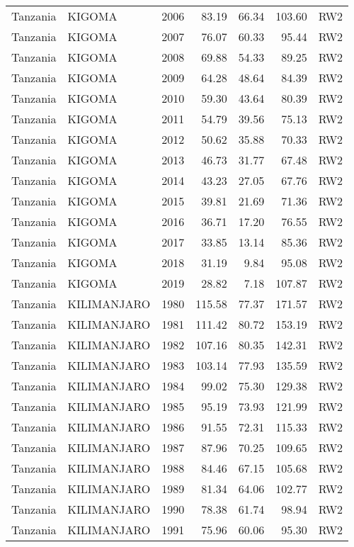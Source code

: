 \begin{longtable}{lllrrrl}
  Tanzania & KIGOMA & 2006 & 83.19 & 66.34 & 103.60 & RW2 \\ 
  Tanzania & KIGOMA & 2007 & 76.07 & 60.33 & 95.44 & RW2 \\ 
  Tanzania & KIGOMA & 2008 & 69.88 & 54.33 & 89.25 & RW2 \\ 
  Tanzania & KIGOMA & 2009 & 64.28 & 48.64 & 84.39 & RW2 \\ 
  Tanzania & KIGOMA & 2010 & 59.30 & 43.64 & 80.39 & RW2 \\ 
  Tanzania & KIGOMA & 2011 & 54.79 & 39.56 & 75.13 & RW2 \\ 
  Tanzania & KIGOMA & 2012 & 50.62 & 35.88 & 70.33 & RW2 \\ 
  Tanzania & KIGOMA & 2013 & 46.73 & 31.77 & 67.48 & RW2 \\ 
  Tanzania & KIGOMA & 2014 & 43.23 & 27.05 & 67.76 & RW2 \\ 
  Tanzania & KIGOMA & 2015 & 39.81 & 21.69 & 71.36 & RW2 \\ 
  Tanzania & KIGOMA & 2016 & 36.71 & 17.20 & 76.55 & RW2 \\ 
  Tanzania & KIGOMA & 2017 & 33.85 & 13.14 & 85.36 & RW2 \\ 
  Tanzania & KIGOMA & 2018 & 31.19 & 9.84 & 95.08 & RW2 \\ 
  Tanzania & KIGOMA & 2019 & 28.82 & 7.18 & 107.87 & RW2 \\ 
  Tanzania & KILIMANJARO & 1980 & 115.58 & 77.37 & 171.57 & RW2 \\ 
  Tanzania & KILIMANJARO & 1981 & 111.42 & 80.72 & 153.19 & RW2 \\ 
  Tanzania & KILIMANJARO & 1982 & 107.16 & 80.35 & 142.31 & RW2 \\ 
  Tanzania & KILIMANJARO & 1983 & 103.14 & 77.93 & 135.59 & RW2 \\ 
  Tanzania & KILIMANJARO & 1984 & 99.02 & 75.30 & 129.38 & RW2 \\ 
  Tanzania & KILIMANJARO & 1985 & 95.19 & 73.93 & 121.99 & RW2 \\ 
  Tanzania & KILIMANJARO & 1986 & 91.55 & 72.31 & 115.33 & RW2 \\ 
  Tanzania & KILIMANJARO & 1987 & 87.96 & 70.25 & 109.65 & RW2 \\ 
  Tanzania & KILIMANJARO & 1988 & 84.46 & 67.15 & 105.68 & RW2 \\ 
  Tanzania & KILIMANJARO & 1989 & 81.34 & 64.06 & 102.77 & RW2 \\ 
  Tanzania & KILIMANJARO & 1990 & 78.38 & 61.74 & 98.94 & RW2 \\ 
  Tanzania & KILIMANJARO & 1991 & 75.96 & 60.06 & 95.30 & RW2 \\ 

\end{longtable}

